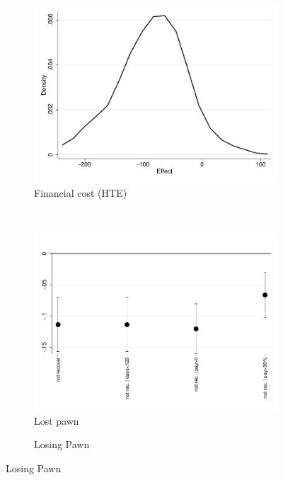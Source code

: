\documentclass[11pt]{article}
\begin{document}
\begin{figure}[H]
\begin{center}
        \bigskip
    
    \begin{subfigure}{0.42\textwidth}
        \caption{Financial cost (HTE)}
        \centering
        \includegraphics[width=\textwidth]{Figuras/he_dist_fc_admin_disc_pro_2.pdf}
    \end{subfigure}
    ~
    ~
    \bigskip
    \begin{subfigure}{0.42\textwidth}
        \caption{Lost pawn}
        \centering
        \includegraphics[width=\textwidth]{Figuras/def_te_pro_2.pdf}
    \end{subfigure}
    \begin{subfigure}{0.42\textwidth}
    \caption{Losing Pawn}
        \centering

\end{subfigure}
\end{center}
\end{figure}
\end{document}
